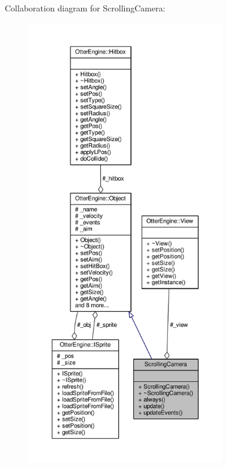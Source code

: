 Collaboration diagram for Scrolling\+Camera\+:\nopagebreak
\begin{figure}[H]
\begin{center}
\leavevmode
\includegraphics[height=550pt]{d2/da1/class_scrolling_camera__coll__graph}
\end{center}
\end{figure}
